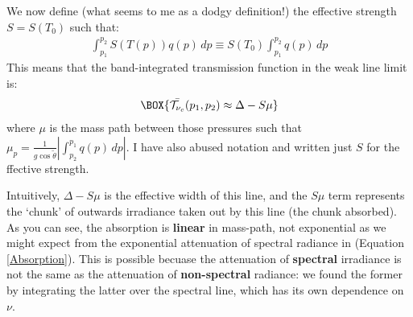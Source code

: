 We now define (what seems to me as a dodgy definition!) the effective strength $S=S(T_0)$ such that:
\begin{align}
    \int_{p_1}^{p_2}S(T(p))q(p)\,dp\equiv
    S(T_0)\int_{p_1}^{p_2}q(p)\,dp
\end{align}
This means that the band-integrated transmission function in the weak line limit is:
\begin{align}
    \BOX{
        \bar{\mathcal{T}_{\nu_c}}(p_1,p_2)\approx\Delta-S\mu
    }
\end{align}
where $\mu$ is the mass path between those pressures such that $\mu_p=\frac{1}{g\cos\tilde{\theta}}\left|\int_{p_2}^{p_1} q(p)\,dp\right|$. I have also abused notation and written just $S$ for the ffective strength.

Intuitively, $\Delta-S\mu$ is the effective width of this line, and the $S\mu$ term represents the `chunk' of outwards irradiance taken out by this line (the chunk absorbed). As you can see, the absorption is \textbf{linear} in mass-path, not exponential as we might expect from the exponential attenuation of spectral radiance in (Equation \ref{Absorption}). This is possible becuase the attenuation of \textbf{spectral} irradiance is not the same as the attenuation of \textbf{non-spectral} radiance: we found the former by integrating the latter over the spectral line, which has its own dependence on $\nu$. 

